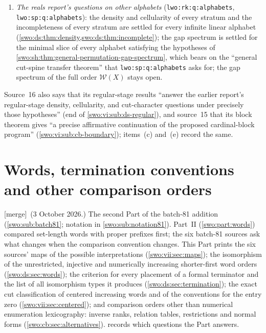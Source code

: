 \documentclass[11pt]{article}
\theoremstyle{definition}
\theoremstyle{remark}
\newcommand{\No}{\mathbf{No}}
\newcommand{\WO}{\mathcal W}
\newcommand{\code}[1]{\texttt{\small #1}}
\newcommand{\merge}{\textsf{[merge]}}
\begin{document}
\begin{enumerate}[label=(\alph*)]
(\code{lwo:sec:research}; item~(e) of \cref{swo:sec:answers}): answered further
for $X=\No_{<\kappa}$, every stratum $\lambda=\mu\cdot\gamma$ and every $n$
(\cref{swo:vi:rem:lwo-display}); open for strata that are not of this form,
for noncardinal cutoffs and for other alphabets.
\item \emph{The reals report's questions on other alphabets}
(\code{lwo:rk:q:alphabets}, \code{lwo:sp:q:alphabets}): the density and
cellularity of every stratum and the incompleteness of every stratum are
settled for every infinite linear alphabet (\cref{swo:ds:thm:density,swo:ds:thm:incomplete});
the gap spectrum is settled for the minimal slice of every alphabet satisfying
the hypotheses of \cref{swo:sh:thm:general-permutation-gap-spectrum}, which
bears on the ``general cut-spine transfer theorem'' that
\code{lwo:sp:q:alphabets} asks for; the gap spectrum of the full order
$\WO(X)$ stays open.
\end{enumerate}
Source~16 also says that its regular-stage results ``answer the earlier
report's regular-stage density, cellularity, and cut-character questions
under precisely those hypotheses'' (end of \cref{swo:vi:sub:ds-regular}), and
source~15 that its block theorem gives ``a precise affirmative continuation of
the proposed cardinal-block program'' (\cref{swo:vi:sub:cb-boundary}); items~(c)
and~(e) record the same.

\part{Words, termination conventions and other comparison orders}\label{swo:part:conventions}

\merge\ (3 October 2026.) The second Part of the batch-81 addition
(\cref{swo:sub:batch81}; notation in \cref{swo:sub:notation81}). Part~II
(\cref{swo:part:words}) compared set-length words with proper prefixes first;
the six batch-81 sources ask what changes when the comparison convention
changes. This Part prints the six sources' maps of the possible
interpretations (\cref{swo:vii:sec:maps}); the isomorphism of the
unrestricted, injective and numerically increasing shorter-first word orders
(\cref{swo:ds:sec:words}); the criterion for every placement of a formal
terminator and the list of all isomorphism types it produces
(\cref{swo:ds:sec:termination}); the exact cut classification of centered
increasing words and of the conventions for the entry zero
(\cref{swo:vii:sec:centered}); and comparison orders other than numerical
enumeration lexicography: inverse ranks, relation tables, restrictions and
normal forms (\cref{swo:cb:sec:alternatives}). 
records which questions the Part answers.
\end{document}
